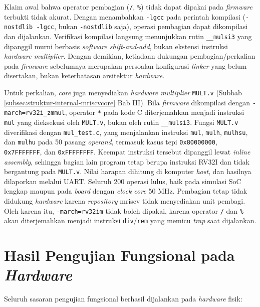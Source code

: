 Klaim awal bahwa operator pembagian (\texttt{/}, \texttt{\%}) tidak dapat dipakai pada \textit{firmware} terbukti tidak akurat. Dengan menambahkan \texttt{-lgcc} pada perintah kompilasi (\texttt{-nostdlib -lgcc}, bukan \texttt{-nostdlib} saja), operasi pembagian dapat dikompilasi dan dijalankan. Verifikasi kompilasi langsung menunjukkan rutin \texttt{\_\_mulsi3} yang dipanggil murni berbasis \textit{software shift-and-add}, bukan ekstensi instruksi \textit{hardware multiplier}. Dengan demikian, ketiadaan dukungan pembagian/perkalian pada \textit{firmware} sebelumnya merupakan persoalan konfigurasi \textit{linker} yang belum disertakan, bukan keterbatasan arsitektur \textit{hardware}.

Untuk perkalian, \textit{core} juga menyediakan \textit{hardware multiplier} \texttt{MULT.v} (Subbab \ref{subsec:struktur-internal-mriscvcore} Bab III). Bila \textit{firmware} dikompilasi dengan \texttt{-march=rv32i\_zmmul}, operator \texttt{*} pada kode C diterjemahkan menjadi instruksi \texttt{mul} yang dieksekusi oleh \texttt{MULT.v}, bukan oleh rutin \texttt{\_\_mulsi3}. Fungsi \texttt{MULT.v} diverifikasi dengan \texttt{mul\_test.c}, yang menjalankan instruksi \texttt{mul}, \texttt{mulh}, \texttt{mulhsu}, dan \texttt{mulhu} pada 50 pasang \textit{operand}, termasuk kasus tepi \texttt{0x80000000}, \texttt{0x7FFFFFFF}, dan \texttt{0xFFFFFFFF}. Keempat instruksi tersebut dipanggil lewat \textit{inline assembly}, sehingga bagian lain program tetap berupa instruksi RV32I dan tidak bergantung pada \texttt{MULT.v}. Nilai harapan dihitung di komputer \textit{host}, dan hasilnya dilaporkan melalui UART. Seluruh 200 operasi lulus, baik pada simulasi SoC lengkap maupun pada \textit{board} dengan \textit{clock core} 50 MHz. Pembagian tetap tidak didukung \textit{hardware} karena \textit{repository} mriscv tidak menyediakan unit pembagi. Oleh karena itu, \texttt{-march=rv32im} tidak boleh dipakai, karena operator \texttt{/} dan \texttt{\%} akan diterjemahkan menjadi instruksi \texttt{div}/\texttt{rem} yang memicu \textit{trap} saat dijalankan.

\section{Hasil Pengujian Fungsional pada \textit{Hardware}}
\label{sec:hasil-fungsional}

Seluruh sasaran pengujian fungsional berhasil dijalankan pada \textit{hardware} fisik:

